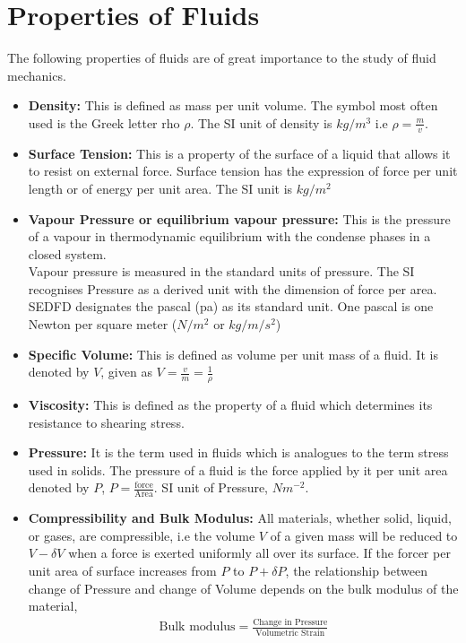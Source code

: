 \documentclass[11pt]{report}
\newcommand{\bt}[1]{\textbf{#1}}
\begin{document}
	\section{Properties of Fluids}
	The following properties of fluids are of great importance to the study of fluid mechanics.
	\begin{itemize}[label=--]
		\item \bt{Density:} This is defined as mass per unit volume. The symbol most often used is the Greek letter rho $\rho$. The SI unit of density is $kg/m^3$ i.e $\rho = \frac{m}{v}$.
		
		\item \bt{Surface Tension:} This is a property of the surface of a liquid that allows it to resist on external force. Surface tension has the expression of force per unit length or of energy per unit area. The SI unit is $kg/m^2$
		
		\item \bt{Vapour Pressure or equilibrium vapour pressure: } This is the pressure of a vapour in thermodynamic equilibrium with the condense phases in a closed system.\\
		Vapour pressure is measured in the standard units of pressure. The SI recognises Pressure as a derived unit with the dimension of force per area. SEDFD designates the pascal (pa) as its standard unit. One pascal is one Newton per square meter ($N/m^2$ or $kg/m/s^2$)
		
		\item \bt{Specific Volume:} This is defined as volume per unit mass of a fluid. It is denoted by $V$, given as $V=\frac{v}{m} = \frac{1}{\rho}$
		
		\item \bt{Viscosity:} This is defined as the property of a fluid which determines its resistance to shearing stress.
		
		\item \bt{Pressure:} It is the term used in fluids which is analogues to the term stress used in solids. The pressure of a fluid is the force applied by it per unit area denoted by $P$, $P = \frac{\text{force}}{\text{Area}}$. SI unit of Pressure, $Nm^{-2}$.
		
		\item \bt{Compressibility and Bulk Modulus:} All materials, whether solid, liquid, or gases, are compressible, i.e the volume $V$ of a given mass will be reduced to $V-\delta V$ when a force is exerted uniformly all over its surface. If the forcer per unit area of surface increases from $P$ to $P+\delta P$, the relationship between change of Pressure and change of Volume depends on the bulk modulus of the material,
		\begin{eqnarray*}
			\text{Bulk modulus} = \frac{\text{Change in Pressure}}{\text{Volumetric Strain}}
		\end{eqnarray*}
	

\end{itemize}
\end{document}
